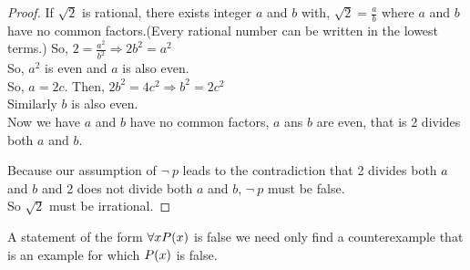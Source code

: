 \documentclass[../main-sheet.tex]{subfiles}
\begin{document}
\begin{proof}
    If \(\sqrt{2}\) is rational, there exists integer \(a\) and \(b\) with, \(\sqrt{2}=\frac{a}{b}\) where $ a $ and $ b $ have no common factors.(Every rational number can be written in the lowest terms.)
    So, \(2=\frac{a^2}{b^2}\Rightarrow2b^2=a^2\) \\
    So, \(a^2\) is even and $ a $ is also even.\\
    So, \(a=2c\). Then, \(2b^2=4c^2\Rightarrow b^2=2c^2\)\\
    Similarly $ b $ is also even.\\
    Now we have $ a $ and $ b $ have no common factors, $ a $ ans $ b $ are even, that is 2 divides both $ a $ and $ b $.

    Because our assumption of \(\neg\ p\) leads to the contradiction that 2 divides both $ a $ and $ b $ and 2 does not divide both $ a $ and $ b $, \(\neg\ p\) must be false.\\
    So \(\sqrt2\) must be irrational.
\end{proof}
A statement of the form \(\forall xP(x)\) is false we need only find a counterexample that is an example for which \(P(x)\) is false.
\end{document}
